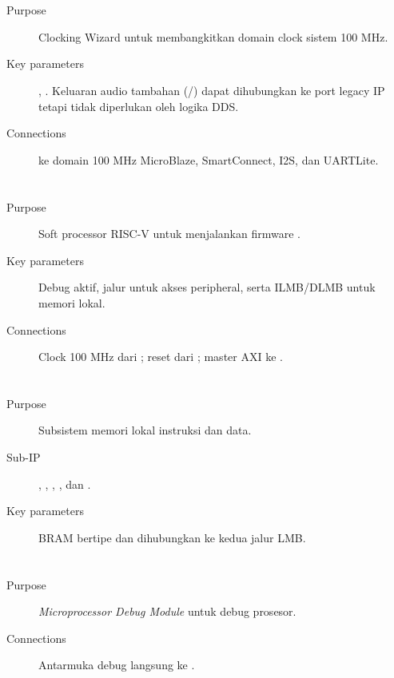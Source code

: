 \section*{}
\begin{description}
    \item[Purpose] Clocking Wizard untuk membangkitkan domain clock sistem 100 MHz.
    \item[Key parameters] , . Keluaran audio tambahan (/) dapat dihubungkan ke port legacy IP tetapi tidak diperlukan oleh logika DDS.
    \item[Connections]  ke domain 100 MHz MicroBlaze, SmartConnect, I2S, dan UARTLite.
\end{description}

\section*{}
\begin{description}
    \item[Purpose] Soft processor RISC-V untuk menjalankan firmware .
    \item[Key parameters] Debug aktif, jalur  untuk akses peripheral, serta ILMB/DLMB untuk memori lokal.
    \item[Connections] Clock 100 MHz dari ; reset dari ; master AXI ke .
\end{description}

\section*{}
\begin{description}
    \item[Purpose] Subsistem memori lokal instruksi dan data.
    \item[Sub-IP] , , , , dan .
    \item[Key parameters] BRAM bertipe  dan dihubungkan ke kedua jalur LMB.
\end{description}

\section*{}
\begin{description}
    \item[Purpose] \textit{Microprocessor Debug Module} untuk debug prosesor.
    \item[Connections] Antarmuka debug langsung ke .
\end{description}

